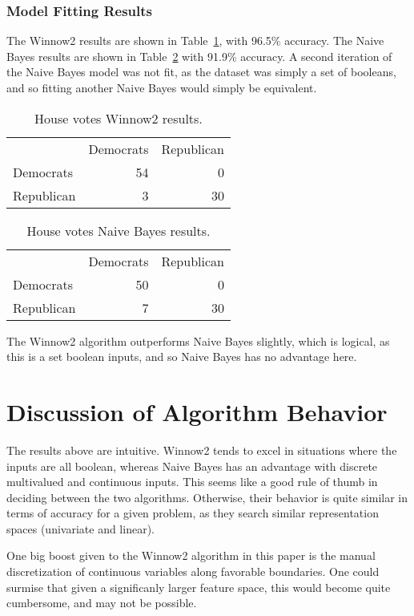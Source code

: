 \documentclass{amsart}
\begin{document}
\subsubsection*{Model Fitting Results}
The Winnow2 results are shown in Table~\ref{winnow_congress}, with 96.5\% accuracy.
The Naive Bayes results are shown in Table~\ref{nb_congress} with 91.9\% accuracy.
A second iteration of the Naive Bayes model was not fit, as the dataset was simply a set of booleans, and so fitting another
Naive Bayes would simply be equivalent.
\begin{table}
\begin{tabular}{lrr}
{} &   Democrats &   Republican \\
Democrats &  54 &   0 \\
Republican &   3 &  30 \\
\end{tabular}
\label{winnow_congress}
\caption{House votes Winnow2 results.}
\end{table}

\begin{table}
\begin{tabular}{lrr}
{} &   Democrats &   Republican \\
Democrats &  50 &   0 \\
Republican &   7 &  30 \\
\end{tabular}
\label{nb_congress}
\caption{House votes Naive Bayes results.}
\end{table}

The Winnow2 algorithm outperforms Naive Bayes slightly, which is logical, as this is a set boolean inputs,
and so Naive Bayes has no advantage here.

\section{Discussion of Algorithm Behavior}
The results above are intuitive. Winnow2 tends to excel in situations where the inputs are all boolean, whereas
Naive Bayes has an advantage with discrete multivalued and continuous inputs. This seems like a good rule of thumb in
deciding between the two algorithms. Otherwise, their behavior is quite similar in terms of accuracy for a given problem,
as they search similar representation spaces (univariate and linear).

One big boost given to the Winnow2 algorithm in this paper is the manual discretization of continuous variables
along favorable boundaries. One could surmise that given a significanly larger feature space, this would
become quite cumbersome, and may not be possible.
\end{document}
